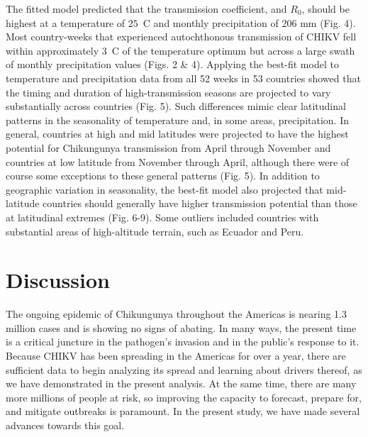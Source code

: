 \documentclass[11pt]{article}
\begin{document}
The fitted model predicted that the transmission coefficient, and $R_0$, should be highest at a temperature of $25$~\degree C and monthly precipitation of 206 mm (Fig. 4). Most country-weeks that experienced autochthonous transmission of CHIKV fell within approximately 3~\degree C of the temperature optimum but across a large swath of monthly precipitation values (Figs. 2 \& 4). Applying the best-fit model to temperature and precipitation data from all 52 weeks in 53 countries showed that the timing and duration of high-transmission seasons are projected to vary substantially across countries (Fig. 5). Such differences mimic clear latitudinal patterns in the seasonality of temperature and, in some areas, precipitation. In general, countries at high and mid latitudes were projected to have the highest potential for Chikungunya transmission from April through November and countries at low latitude from November through April, although there were of course some exceptions to these general patterns (Fig. 5). In addition to geographic variation in seasonality, the best-fit model also projected that mid-latitude countries should generally have higher transmission potential than those at latitudinal extremes (Fig. 6-9). Some outliers included countries with substantial areas of high-altitude terrain, such as Ecuador and Peru.

\section*{Discussion}
The ongoing epidemic of Chikungunya throughout the Americas is nearing 1.3 million cases and is showing no signs of abating. In many ways, the present time is a critical juncture in the pathogen's invasion and in the public's response to it. Because CHIKV has been spreading in the Americas for over a year, there are sufficient data to begin analyzing its spread and learning about drivers thereof, as we have demonstrated in the present analysis. At the same time, there are  many more millions of people at risk, so improving the capacity to forecast, prepare for, and mitigate outbreaks is paramount. In the present study, we have made several advances towards this goal.
\end{document}
